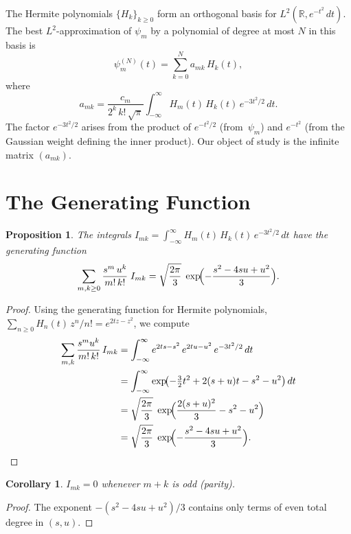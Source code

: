\documentclass[11pt,a4paper]{article}
\theoremstyle{definition}
\theoremstyle{plain}
\newtheorem{proposition}[definition]{Proposition}
\newtheorem{corollary}[definition]{Corollary}
\newcommand{\R}{\mathbb{R}}
\begin{document}
The Hermite polynomials $\{H_k\}_{k \ge 0}$ form an orthogonal basis
for $L^2(\R, e^{-t^2}\,dt)$. The best $L^2$-approximation of $\psi_m$
by a polynomial of degree at most $N$ in this basis is
\[
  \psi_m^{(N)}(t) = \sum_{k=0}^{N} a_{mk}\, H_k(t),
\]
where
\begin{equation}\label{eq:amk}
  a_{mk}
  = \frac{c_m}{2^k\, k!\,\sqrt{\pi}}
    \int_{-\infty}^{\infty} H_m(t)\, H_k(t)\, e^{-3t^2/2}\, dt.
\end{equation}
The factor $e^{-3t^2/2}$ arises from the product of $e^{-t^2/2}$
(from~$\psi_m$) and $e^{-t^2}$ (from the Gaussian weight defining the
inner product). Our object of study is the infinite matrix $(a_{mk})$.

\section{The Generating Function}

\begin{proposition}\label{prop:genfn}
The integrals $I_{mk} = \int_{-\infty}^{\infty} H_m(t)\, H_k(t)\,
e^{-3t^2/2}\, dt$ have the generating function
\[
  \sum_{m,k \ge 0} \frac{s^m\, u^k}{m!\, k!}\; I_{mk}
  = \sqrt{\frac{2\pi}{3}}\;
    \exp\!\Bigl(-\frac{s^2 - 4su + u^2}{3}\Bigr).
\]
\end{proposition}

\begin{proof}
Using the generating function for Hermite polynomials,
$\sum_{n \ge 0} H_n(t)\, z^n / n! = e^{2tz - z^2}$, we compute
\begin{align*}
  \sum_{m,k} \frac{s^m u^k}{m!\,k!}\, I_{mk}
  &= \int_{-\infty}^{\infty}
     e^{2ts - s^2}\, e^{2tu - u^2}\, e^{-3t^2/2}\, dt \\
  &= \int_{-\infty}^{\infty}
     \exp\!\bigl(-\tfrac{3}{2}t^2 + 2(s+u)t - s^2 - u^2\bigr)\, dt \\
  &= \sqrt{\frac{2\pi}{3}}\;
     \exp\!\Bigl(\frac{2(s+u)^2}{3} - s^2 - u^2\Bigr) \\
  &= \sqrt{\frac{2\pi}{3}}\;
     \exp\!\Bigl(-\frac{s^2 - 4su + u^2}{3}\Bigr).
     \qedhere
\end{align*}
\end{proof}

\begin{corollary}\label{cor:parity}
$I_{mk} = 0$ whenever $m + k$ is odd (parity).
\end{corollary}
\begin{proof}
The exponent $-(s^2 - 4su + u^2)/3$ contains only terms of even total
degree in $(s,u)$.
\end{proof}
\end{document}
